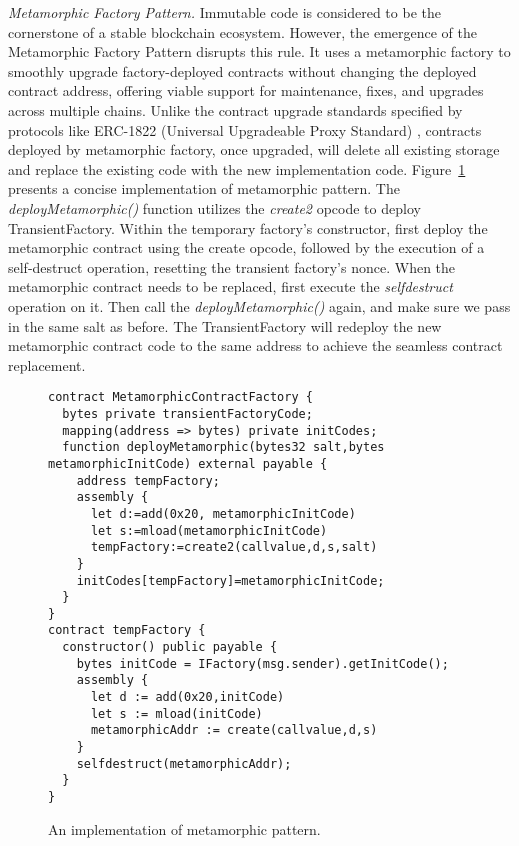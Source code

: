 \documentclass[acmsmall,screen]{acmart}
\begin{document}
	\textit{Metamorphic Factory Pattern.} Immutable code is considered to be the cornerstone of a stable blockchain ecosystem. However, the emergence of the Metamorphic Factory Pattern disrupts this rule. It uses a metamorphic factory to smoothly upgrade factory-deployed contracts without changing the deployed contract address, offering viable support for maintenance, fixes, and upgrades across multiple chains. Unlike the contract upgrade standards specified by protocols like ERC-1822 (Universal Upgradeable Proxy Standard) \cite{eip-1822}, contracts deployed by metamorphic factory, once upgraded, will delete all existing storage and replace the existing code with the new implementation code. Figure~\ref{lst:metamorphic} presents a concise implementation of metamorphic pattern. The \textit{deployMetamorphic()} function utilizes the \textit{create2} opcode to deploy TransientFactory. Within the temporary factory's constructor, first deploy the metamorphic contract using the create opcode, followed by the execution of a self-destruct operation, resetting the transient factory's nonce. When the metamorphic contract needs to be replaced, first execute the \textit{selfdestruct} operation on it. Then call the \textit{deployMetamorphic()} again, and make sure we pass in the same salt as before. The TransientFactory will redeploy the new metamorphic contract code to the same address to achieve the seamless contract replacement.

	\begin{figure}[t]
		\begin{minipage}{\linewidth}
			\begin{lstlisting}
contract MetamorphicContractFactory {
  bytes private transientFactoryCode;
  mapping(address => bytes) private initCodes;
  function deployMetamorphic(bytes32 salt,bytes metamorphicInitCode) external payable {
    address tempFactory;
    assembly {
      let d:=add(0x20, metamorphicInitCode)
      let s:=mload(metamorphicInitCode)
      tempFactory:=create2(callvalue,d,s,salt)
    }
    initCodes[tempFactory]=metamorphicInitCode;
  }
}
contract tempFactory {
  constructor() public payable {
    bytes initCode = IFactory(msg.sender).getInitCode();
    assembly {
      let d := add(0x20,initCode)
      let s := mload(initCode)
      metamorphicAddr := create(callvalue,d,s)
    }
    selfdestruct(metamorphicAddr);
  }
}
			\end{lstlisting}
		\end{minipage}
		\caption{An implementation of metamorphic pattern.}
		\label{lst:metamorphic}
	\end{figure}
\end{document}
